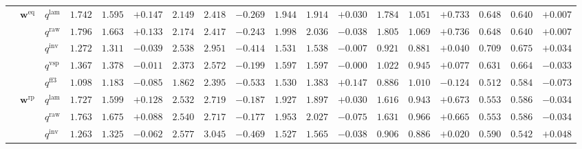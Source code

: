 \documentclass{article}
\begin{document}
\begin{table}[!htbp]
{\begin{tabular}{lll ccc ccc ccc ccc ccc}
\cmidrule(lr){2-18}
 & $\mathbf{w}^{\mathrm{eq}}$ & $q^{\mathrm{lam}}$ & $1.742$ & $1.595$ & \cellcolor{posgreen!50}$+0.147$ & $2.149$ & $2.418$ & \cellcolor{negred!50}$-0.269$ & $1.944$ & $1.914$ & \cellcolor{posgreen!50}$+0.030$ & $1.784$ & $1.051$ & \cellcolor{posgreen!50}$+0.733$ & $0.648$ & $0.640$ & \cellcolor{posgreen!50}$+0.007$ \\
 &  & $q^{\mathrm{raw}}$ & $1.796$ & $1.663$ & \cellcolor{posgreen!50}$+0.133$ & $2.174$ & $2.417$ & \cellcolor{negred!50}$-0.243$ & $1.998$ & $2.036$ & \cellcolor{negred!50}$-0.038$ & $1.805$ & $1.069$ & \cellcolor{posgreen!50}$+0.736$ & $0.648$ & $0.640$ & \cellcolor{posgreen!50}$+0.007$ \\
 &  & $q^{\mathrm{inv}}$ & $1.272$ & $1.311$ & \cellcolor{negred!50}$-0.039$ & $2.538$ & $2.951$ & \cellcolor{negred!50}$-0.414$ & $1.531$ & $1.538$ & \cellcolor{negred!50}$-0.007$ & $0.921$ & $0.881$ & \cellcolor{posgreen!50}$+0.040$ & $0.709$ & $0.675$ & \cellcolor{posgreen!50}$+0.034$ \\
 &  & $q^{\mathrm{vsp}}$ & $1.367$ & $1.378$ & \cellcolor{negred!50}$-0.011$ & $2.373$ & $2.572$ & \cellcolor{negred!50}$-0.199$ & $1.597$ & $1.597$ & $-0.000$ & $1.022$ & $0.945$ & \cellcolor{posgreen!50}$+0.077$ & $0.631$ & $0.664$ & \cellcolor{negred!50}$-0.033$ \\
 &  & $q^{\mathrm{ff3}}$ & $1.098$ & $1.183$ & \cellcolor{negred!50}$-0.085$ & $1.862$ & $2.395$ & \cellcolor{negred!50}$-0.533$ & $1.530$ & $1.383$ & \cellcolor{posgreen!50}$+0.147$ & $0.886$ & $1.010$ & \cellcolor{negred!50}$-0.124$ & $0.512$ & $0.584$ & \cellcolor{negred!50}$-0.073$ \\
\cmidrule(lr){2-18}
 & $\mathbf{w}^{\mathrm{rp}}$ & $q^{\mathrm{lam}}$ & $1.727$ & $1.599$ & \cellcolor{posgreen!50}$+0.128$ & $2.532$ & $2.719$ & \cellcolor{negred!50}$-0.187$ & $1.927$ & $1.897$ & \cellcolor{posgreen!50}$+0.030$ & $1.616$ & $0.943$ & \cellcolor{posgreen!50}$+0.673$ & $0.553$ & $0.586$ & \cellcolor{negred!50}$-0.034$ \\
 &  & $q^{\mathrm{raw}}$ & $1.763$ & $1.675$ & \cellcolor{posgreen!50}$+0.088$ & $2.540$ & $2.717$ & \cellcolor{negred!50}$-0.177$ & $1.953$ & $2.027$ & \cellcolor{negred!50}$-0.075$ & $1.631$ & $0.966$ & \cellcolor{posgreen!50}$+0.665$ & $0.553$ & $0.586$ & \cellcolor{negred!50}$-0.034$ \\
 &  & $q^{\mathrm{inv}}$ & $1.263$ & $1.325$ & \cellcolor{negred!50}$-0.062$ & $2.577$ & $3.045$ & \cellcolor{negred!50}$-0.469$ & $1.527$ & $1.565$ & \cellcolor{negred!50}$-0.038$ & $0.906$ & $0.886$ & \cellcolor{posgreen!50}$+0.020$ & $0.590$ & $0.542$ & \cellcolor{posgreen!50}$+0.048$ \\

\end{tabular}}
\end{table}
\end{document}
